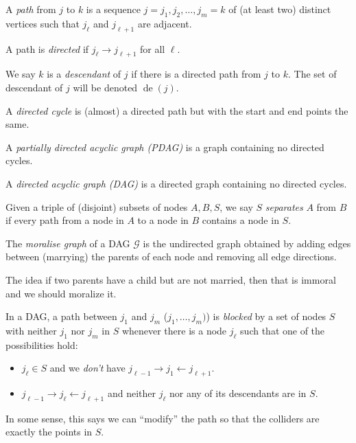 \documentclass[a4paper]{article}
\DeclareMathOperator\de{de}
\begin{document}
\begin{defi}[Path]
  A \emph{path} from $j$ to $k$ is a sequence $j = j_1, j_2, \ldots, j_m = k$ of (at least two) distinct vertices such that $j_\ell$ and $j_{\ell + 1}$ are adjacent.

  A path is \emph{directed} if $j_\ell \to j_{\ell + 1}$ for all $\ell$.
\end{defi}

\begin{defi}[Descendent]
  We say $k$ is a \emph{descendant} of $j$ if there is a directed path from $j$ to $k$. The set of descendant of $j$ will be denoted $\de(j)$.
\end{defi}

\begin{defi}
  A \emph{directed cycle} is (almost) a directed path but with the start and end points the same.
\end{defi}

\begin{defi}
  A \emph{partially directed acyclic graph (PDAG)} is a graph containing no directed cycles.
\end{defi}

\begin{defi}
  A \emph{directed acyclic graph (DAG)} is a directed graph containing no directed cycles.
\end{defi}

\begin{defi}[Separates]
  Given a triple of (disjoint) subsets of nodes $A, B, S$, we say $S$ \emph{separates} $A$ from $B$ if every path from a node in $A$ to a node in $B$ contains a node in $S$.
\end{defi}

\begin{defi}
  The \emph{moralise graph} of a DAG $\mathcal{G}$ is the undirected graph obtained by adding edges between (marrying) the parents of each node and removing all edge directions.
\end{defi}
The idea if two parents have a child but are not married, then that is immoral and we should moralize it.

\begin{defi}[Blocked]
  In a DAG, a path between $j_1$ and $j_m$ ($j_1, \ldots, j_m)$) is \emph{blocked} by a set of nodes $S$ with neither $j_1$ nor $j_m$ in $S$ whenever there is a node $j_\ell$ such that one of the possibilities hold:
  \begin{itemize}
    \item $j_\ell \in S$ and we \emph{don't} have $j_{\ell - 1} \to j_1 \leftarrow j_{\ell + 1}$.
    \item $j_{\ell - 1} \to j_{\ell} \leftarrow j_{\ell + 1}$ and neither $j_\ell$ nor any of its descendants are in $S$.
  \end{itemize}
\end{defi}
In some sense, this says we can ``modify'' the path so that the colliders are exactly the points in $S$.
\end{document}
